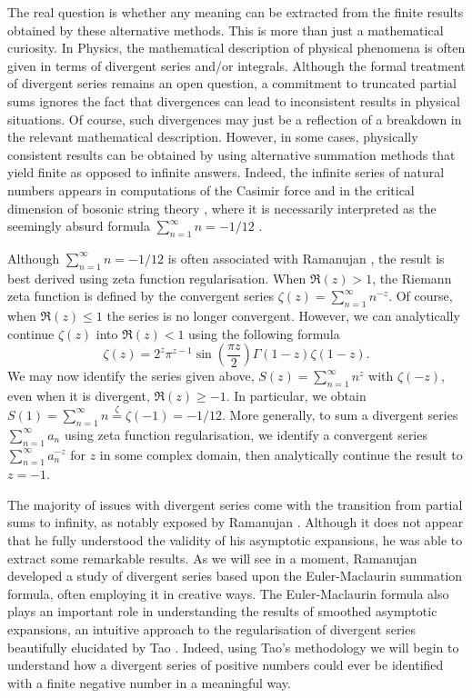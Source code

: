 \documentclass[12pt, letter]{article}
\begin{document}
 The real question is whether any meaning can  be extracted from the finite results obtained by these alternative methods. This is more than just a mathematical curiosity. In Physics, the mathematical description of  physical phenomena is often given in terms of divergent series and/or integrals. Although the formal treatment of divergent series remains an open question, a  commitment to truncated partial sums ignores the fact that divergences can lead to inconsistent results in physical situations. Of course, such divergences may just be a reflection of a breakdown in the relevant mathematical description. However, in some cases, physically consistent results can be obtained by using alternative summation methods that yield finite  as opposed to infinite answers. Indeed, the infinite series of natural numbers appears in computations of the Casimir force \cite{Schwartz14} and in the critical dimension of bosonic string theory \cite{Polchinski98}, where it is necessarily interpreted as the seemingly absurd formula $\sum_{n=1}^\infty n = -1/12$ \citep{Hardy73,Berndt85}. 
 
 Although  $\sum_{n=1}^\infty n = -1/12$ is often associated with Ramanujan \cite{Berndt85}, the result is best derived using zeta function regularisation.  When $\Re(z)>1$, the Riemann zeta function is defined by the convergent series $\zeta(z)=\sum_{n=1}^\infty n^{-z}$. Of course, when $\Re(z) \leq 1$ the series is no longer convergent. However, we can analytically continue $\zeta(z)$ into $\Re(z)<1$ using the following formula
 $$
 \zeta(z)=2^z \pi^{z-1} \sin\left(\frac{\pi z}{2} \right) \Gamma(1-z) \zeta(1-z).
 $$
 We may now identify the series given above,  $S(z)=\sum_{n=1}^\infty n^{z}$ with $\zeta(-z)$, even when it is divergent, $\Re(z)\geq -1$.  In particular,  we obtain $S(1)=\sum_{n=1}^\infty n \overset{\zeta}{=}\zeta(-1)=-1/12$.  More generally, to sum a divergent series $\sum_{n=1}^\infty a_n$ using zeta function regularisation, we identify a convergent series $\sum_{n=1}^\infty a_n^{-z}$ for $z$ in some complex domain, then analytically continue the result to $z=-1$. 



The majority of issues with divergent series come with the transition from partial sums to infinity, as notably exposed by Ramanujan \citep{Berndt85,Hardy73}. Although it does not appear that he  fully understood the validity of his  asymptotic expansions, he was able to extract some remarkable results. As we will see in a moment,  Ramanujan developed a study of divergent series based upon the Euler-Maclaurin summation formula, often employing it in creative ways.  The Euler-Maclaurin formula also plays an important role in understanding the results of smoothed asymptotic expansions, an intuitive approach to the regularisation of divergent series beautifully elucidated by Tao \citep{Tao11}. Indeed, using Tao's methodology we will begin to understand how a divergent series of positive numbers could ever be identified with a finite negative number in a meaningful way. 
\end{document}
